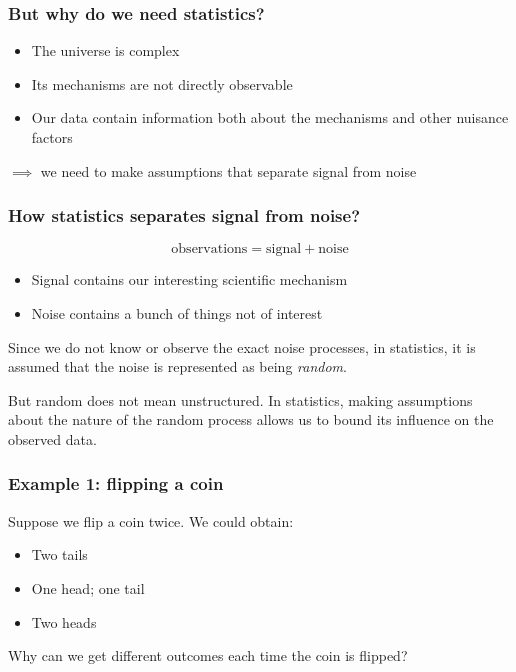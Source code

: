 \documentclass[handout]{beamer}
\begin{document}
\begin{frame}
	\frametitle{But why do we need statistics?}
	
	\begin{itemize}
		\item The universe is complex
		\item Its mechanisms are not directly observable
		\item Our data contain information both about the mechanisms and other nuisance factors
	\end{itemize}
	
	$\implies$ we need to make assumptions that separate signal from noise
	
\end{frame}

\begin{frame}
	\frametitle{How statistics separates signal from noise?}
	
	\begin{equation}
	\text{observations} = \text{signal} + \text{noise}
	\end{equation}
	
	\begin{itemize}
		\item Signal contains our interesting scientific mechanism
		\item Noise contains a bunch of things not of interest
	\end{itemize}
	
	Since we do not know or observe the exact noise processes, in statistics, it is assumed that the noise is represented as being \textit{random}.
	
	\vspace{0.5cm}
	
	But random does not mean unstructured. In statistics, making assumptions about the nature of the random process allows us to bound its influence on the observed data.
	
\end{frame}

\begin{frame}
	\frametitle{Example 1: flipping a coin}
	
	Suppose we flip a coin twice. We could obtain:
	
	\begin{itemize}
		\item Two tails
		\item One head; one tail
		\item Two heads
	\end{itemize}
	
	Why can we get different outcomes each time the coin is flipped?
	
\end{frame}
\end{document}
